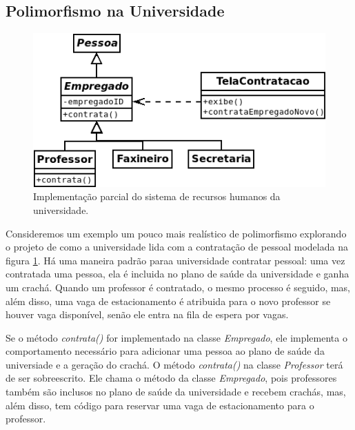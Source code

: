 \documentclass[
	article,			%
	12pt,				%
	openright,
	twoside,			%
	a4paper,			%
	english,			%
	french,
	brazil,				%
	sumario=tradicional
	]{abntex2}
\begin{document}

\subsection{Polimorfismo na Universidade}
\begin{figure}
\begin{center}
\includegraphics[scale=0.65]{uniRH.png}
\end{center}
\caption{Implementação parcial do sistema de recursos humanos da universidade.} \label{fig:uniRH}
\end{figure}

Consideremos um exemplo um pouco mais realístico de polimorfismo explorando o projeto de como a universidade lida com a contratação de pessoal modelada na figura \ref{fig:uniRH}. Há uma maneira padrão paraa universidade contratar pessoal: uma vez contratada uma pessoa, ela é incluida no plano de saúde da universidade e ganha um crachá. Quando um professor é contratado, o mesmo processo é seguido, mas, além disso, uma vaga de estacionamento é atribuida para o novo professor se houver vaga disponível, senão ele entra na fila de espera por vagas.

Se o método \emph{contrata()} for implementado na classe \emph{Empregado}, ele implementa o comportamento necessário para adicionar uma pessoa ao plano de saúde da universiade e a geração do crachá. O método \emph{contrata()} na classe \emph{Professor} terá de ser sobreescrito. Ele chama o método da classe \emph{Empregado}, pois professores também são inclusos no plano de saúde da universidade e recebem crachás, mas, além disso, tem código para reservar uma vaga de estacionamento para o professor.
\end{document}
